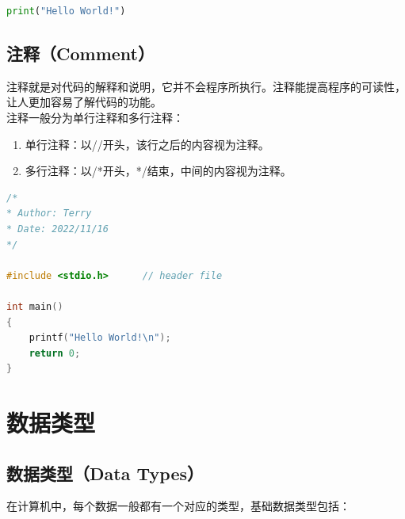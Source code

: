 \vspace{0.5cm}


\begin{lstlisting}[language=Python]
print("Hello World!")
\end{lstlisting}

\vspace{0.5cm}

\subsection{注释（Comment）}

注释就是对代码的解释和说明，它并不会程序所执行。注释能提高程序的可读性，让人更加容易了解代码的功能。\\

注释一般分为单行注释和多行注释：

\begin{enumerate}
	\item 单行注释：以//开头，该行之后的内容视为注释。
	\item 多行注释：以/*开头，*/结束，中间的内容视为注释。
\end{enumerate}

\vspace{0.5cm}


\begin{lstlisting}[language=C]
/*
* Author: Terry
* Date: 2022/11/16
*/

#include <stdio.h>      // header file

int main()
{
	printf("Hello World!\n");
	return 0;
}
\end{lstlisting}

\newpage

\section{数据类型}

\subsection{数据类型（Data Types）}

在计算机中，每个数据一般都有一个对应的类型，基础数据类型包括：

